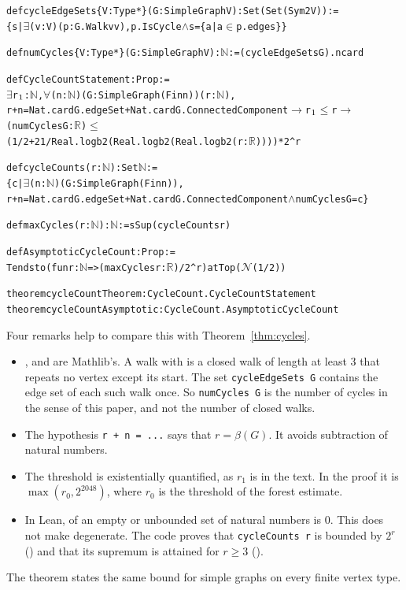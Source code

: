 \documentclass[11pt]{article}
\theoremstyle{definition}
\theoremstyle{remark}
\begin{document}
{\small
\begin{alltt}
def cycleEdgeSets \{V : Type*\} (G : SimpleGraph V) : Set (Set (Sym2 V)) :=
  \{s | \(\exists\) (v : V) (p : G.Walk v v), p.IsCycle \(\land\) s = \{a | a \(\in\) p.edges\}\}

def numCycles \{V : Type*\} (G : SimpleGraph V) : \(\mathbb{N}\) := (cycleEdgeSets G).ncard

def CycleCountStatement : Prop :=
  \(\exists\) r\(\sb{1}\) : \(\mathbb{N}\), \(\forall\) (n : \(\mathbb{N}\)) (G : SimpleGraph (Fin n)) (r : \(\mathbb{N}\)),
    r + n = Nat.card G.edgeSet + Nat.card G.ConnectedComponent \(\to\) r\(\sb{1}\) \(\le\) r \(\to\)
    (numCycles G : \(\mathbb{R}\)) \(\le\)
      (1 / 2 + 21 / Real.logb 2 (Real.logb 2 (Real.logb 2 (r : \(\mathbb{R}\))))) * 2 ^ r

def cycleCounts (r : \(\mathbb{N}\)) : Set \(\mathbb{N}\) :=
  \{c | \(\exists\) (n : \(\mathbb{N}\)) (G : SimpleGraph (Fin n)),
    r + n = Nat.card G.edgeSet + Nat.card G.ConnectedComponent \(\land\) numCycles G = c\}

def maxCycles (r : \(\mathbb{N}\)) : \(\mathbb{N}\) := sSup (cycleCounts r)

def AsymptoticCycleCount : Prop :=
  Tendsto (fun r : \(\mathbb{N}\) => (maxCycles r : \(\mathbb{R}\)) / 2 ^ r) atTop (\(\mathcal{N}\) (1 / 2))

theorem cycleCountTheorem : CycleCount.CycleCountStatement
theorem cycleCountAsymptotic : CycleCount.AsymptoticCycleCount
\end{alltt}}

Four remarks help to compare this with Theorem~\ref{thm:cycles}.
\begin{itemize}
\item {},  and  are Mathlib's. A walk with 
is a closed walk of length at least $3$ that repeats no vertex except its start. The set
\texttt{cycleEdgeSets G} contains the edge set of each such walk once. So \texttt{numCycles G} is the
number of cycles in the sense of this paper, and not the number of closed walks.
\item The hypothesis \texttt{r + n = ...} says that $r=\beta(G)$. It avoids subtraction of natural
numbers.
\item The threshold is existentially quantified, as $r_1$ is in the text. In the proof it is
$\max(r_0,2^{2048})$, where $r_0$ is the threshold of the forest estimate.
\item In Lean,  of an empty or unbounded set of natural numbers is $0$. This does not
make  degenerate. The code proves that \texttt{cycleCounts r} is bounded by $2^{r}$
() and that its supremum is attained for $r\ge3$ ().
\end{itemize}
The theorem  states the same bound for simple graphs on every
finite vertex type.
\end{document}

